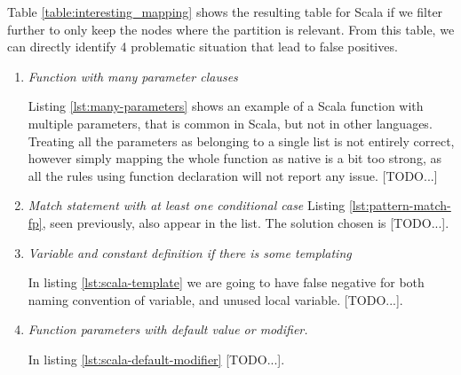 Table \ref{table:interesting_mapping} shows the resulting table for Scala if we filter further to only keep the nodes where the partition is relevant. From this table, we can directly identify 4 problematic situation that lead to false positives.

\begin{enumerate}
	\item \textit{Function with many parameter clauses} \newline 
	
	
	Listing \ref{lst:many-parameters} shows an example of a Scala function with multiple parameters, that is common in Scala, but not in other languages. 
	Treating all the parameters as belonging to a single list is not entirely correct, however simply mapping the whole function as native is a bit too strong, as all the rules using function declaration will not report any issue.
	[TODO...]
	
	\item \textit{Match statement with at least one conditional case} \newline 
	Listing \ref{lst:pattern-match-fp}, seen previously, also appear in the list. The solution chosen is 
	[TODO...].
	
	\item \textit{Variable and constant definition if there is some templating} \newline 
	
	
	In listing \ref{lst:scala-template} we are going to have false negative for both naming convention of variable, and unused local variable. 
	[TODO...].
	
	\item \textit{Function parameters with default value or modifier.} \newline 
	
	
	In listing \ref{lst:scala-default-modifier}
	[TODO...].
\end{enumerate}

